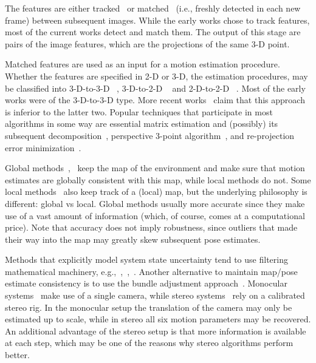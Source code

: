 The features are either tracked~\cite{Hedborg2009} or
matched~\cite{Geiger2011} (i.e., freshly detected in each new frame)
between subsequent images. While the early works chose to track
features, most of the current works detect and match them. The output
of this stage are pairs of the image features, which are the
projections of the same 3-D point.

Matched features are used as an input for a motion estimation
procedure.  Whether the features are specified in 2-D or 3-D, the
estimation procedures, may be classified into 3-D-to-3-D
~\cite{Milella2006}, 3-D-to-2-D ~\cite{Geiger2011} and 2-D-to-2-D
~\cite{Nister2004}. Most of the early works were of the 3-D-to-3-D
type.  More recent works~\cite{Nister2004} claim that this approach is
inferior to the latter two. Popular techniques that participate in
most algorithms in some way are essential matrix estimation and
(possibly) its subsequent decomposition~\cite{Nister2004}, perspective
3-point algorithm~\cite{Kneip1991}, and re-projection error
minimization~\cite{Geiger2011}.

Global methods~\cite{Klein2007},~\cite{Newcombe2011} keep the map of
the environment and make sure that motion estimates are globally
consistent with this map, while local methods do not.  Some local
methods~\cite{Badino2013} also keep track of a (local) map, but the
underlying philosophy is different: global vs local.  Global methods
usually more accurate since they make use of a vast amount of
information (which, of course, comes at a computational price).  Note
that accuracy does not imply robustness, since outliers that made
their way into the map may greatly skew subsequent pose estimates.

Methods that explicitly model system state uncertainty tend to use
filtering mathematical machinery,
e.g.,~\cite{Konolige2010},~\cite{Olson2003},~\cite{Kaess2008}.
Another alternative to maintain map/pose estimate consistency is to
use the bundle adjustment approach~\cite{Triggs2000}. Monocular
systems~\cite{Song} make use of a single camera, while stereo
systems~\cite{Geiger2011} rely on a calibrated stereo rig. In the
monocular setup the translation of the camera may only be estimated up
to scale, while in stereo all six motion parameters may be
recovered. An additional advantage of the stereo setup is that more
information is available at each step, which may be one of the reasons
why stereo algorithms perform better.

